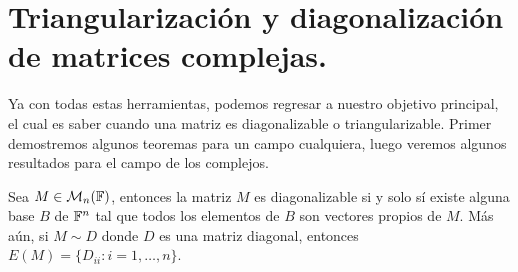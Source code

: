 \section{Triangularización y diagonalización de matrices complejas.}

Ya con todas estas herramientas, podemos regresar a nuestro objetivo principal, el cual es saber cuando una matriz es diagonalizable o triangularizable. Primer demostremos algunos teoremas para un campo cualquiera, luego veremos algunos resultados para el campo de los complejos.

\begin{teor}
  Sea $M \in \mathcal{M}_n(\mathbb{F})$, entonces la matriz $M$ es diagonalizable si y solo sí existe alguna base $B$ de $\mathbb{F}^n$ tal que todos los elementos de $B$ son vectores propios de $M$. Más aún, si $M\sim D$ donde $D$ es una matriz diagonal, entonces $E(M) = \{ D_{ii} : i = 1,\ldots,n \}$.
\end{teor}
